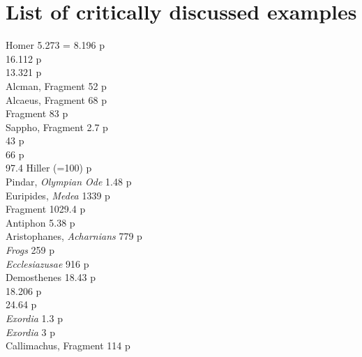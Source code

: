 \section*{List of critically discussed examples}\label{critical}
Homer 5.273 = 8.196 \dotfill p\pageref{Homer5273}\\
\phantom{Homer} 16.112 \dotfill p\pageref{moipron2}\\
\phantom{Homer} 13.321 \dotfill p\pageref{ke12}\\
Alcman, Fragment 52 \dotfill p\pageref{ask7}\\
Alcaeus, Fragment 68 \dotfill p\pageref{alcaeus}\\
\phantom{Alcaeus,} Fragment 83 \dotfill p\pageref{Alcaeus83}\\
Sappho, Fragment 2.7 \dotfill p\pageref{sappho1}\\
\phantom{Sappho, Fragment} 43 \dotfill p\pageref{sappho2}\\
\phantom{Sappho, Fragment} 66 \dotfill p\pageref{Sappho66}\\
\phantom{Sappho, Fragment} 97.4 Hiller (=100) \dotfill p\pageref{sappho3}\\
Pindar, \textit{Olympian Ode} 1.48 \dotfill p\pageref{Pind1.48}\\
Euripides, \textit{Medea} 1339 \dotfill p\pageref{relan27}\\
\phantom{Euripides,} Fragment 1029.4 \dotfill p\pageref{EurFragm1029}\\
Antiphon 5.38 \dotfill p\pageref{Antiph538}\\
Aristophanes, \textit{Acharnians} 779 \dotfill p\pageref{ask8}\\
\phantom{Aristophanes,} \textit{Frogs} 259 \dotfill p\pageref{AristophFrogs259}\\
\phantom{Aristophanes,} \textit{Ecclesiazusae} 916 \dotfill p\pageref{oposan8}\\
Demosthenes 18.43 \dotfill p\pageref{relan26}\\
\phantom{Demosthenes} 18.206 \dotfill p\pageref{relan22}\\
\phantom{Demosthenes} 24.64 \dotfill p\pageref{relan34}\\
\phantom{Demosthenes} \textit{Exordia} 1.3 \dotfill p\pageref{relan76}\\
\phantom{Demosthenes} \textit{Exordia} 3 \dotfill p\pageref{wordgroup42}\\
Callimachus, Fragment 114 \dotfill p\pageref{ask9}\\
